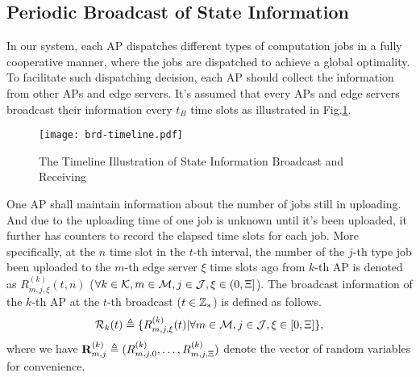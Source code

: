\subsection{Periodic Broadcast of State Information}
In our system, each AP dispatches different types of computation jobs in a fully cooperative manner, where the jobs are dispatched to achieve a global optimality.
To facilitate such dispatching decision, each AP should collect the information from other APs and edge servers.
It's assumed that every APs and edge servers broadcast their information every $t_B$ time slots as illustrated in Fig.\ref{fig:brd-timeline}.
\begin{figure}[ht]
    \centering
    \texttt{[image: brd-timeline.pdf]}
    \caption{The Timeline Illustration of State Information Broadcast and Receiving}
    \label{fig:brd-timeline}
\end{figure}

One AP shall maintain information about the number of jobs still in uploading. 
And due to the uploading time of one job is unknown until it's been uploaded, it further has counters to record the elapsed time slots for each job.
More specifically, at the $n$ time slot in the $t$-th interval, the number of the $j$-th type job been uploaded to the $m$-th edge server $\xi$ time slots ago from $k$-th AP is denoted as $R^{(k)}_{m,j,\xi}({t,n})$ ($\forall k\in\mathcal{K}, m\in\mathcal{M}, j\in\mathcal{J}, \xi\in(0,\Xi]$).
The broadcast information of the $k$-th AP at the $t$-th broadcast ($t\in\mathbb{Z}_{*}$) is defined as follows.
\begin{align}
    \mathcal{R}_{k}({t}) \triangleq \{R^{(k)}_{m,j,\xi}({t}) | \forall m\in\mathcal{M}, j\in\mathcal{J}, \xi \in [0,\Xi]\},
\end{align}
where we have $\mathbf{R}^{(k)}_{m,j} \triangleq ( R^{(k)}_{m,j,0},\dots,R^{(k)}_{m,j,\Xi} )$ denote the vector of random variables for convenience.

